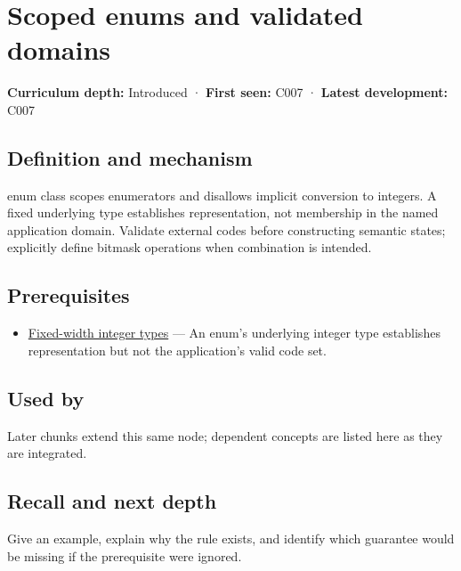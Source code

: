 \hypertarget{appendix-23640fcee147}{}
\section{Scoped enums and validated domains}\label{appendix-23640fcee147-scoped-enums-and-validated-domains}

\textbf{Curriculum depth:} Introduced · \textbf{First seen:} C007 · \textbf{Latest development:} C007

\subsection{Definition and mechanism}\label{appendix-23640fcee147-definition-and-mechanism}

enum class scopes enumerators and disallows implicit conversion to integers. A fixed underlying type establishes representation, not membership in the named application domain. Validate external codes before constructing semantic states; explicitly define bitmask operations when combination is intended.

\subsection{Prerequisites}\label{appendix-23640fcee147-prerequisites}

\begin{itemize}
\tightlist
\item
  \hyperref[appendix-cc04044b5782]{Fixed-width integer types} --- An enum's underlying integer type establishes representation but not the application's valid code set.
\end{itemize}

\subsection{Used by}\label{appendix-23640fcee147-used-by}

Later chunks extend this same node; dependent concepts are listed here as they are integrated.

\subsection{Recall and next depth}\label{appendix-23640fcee147-recall-and-next-depth}

Give an example, explain why the rule exists, and identify which guarantee would be missing if the prerequisite were ignored.

